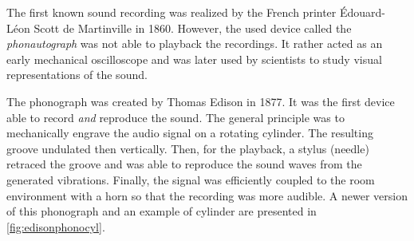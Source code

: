 The first known sound recording was realized by the French printer Édouard-Léon Scott de Martinville in 1860. However, the used device called the \emph{phonautograph} was not able to playback the recordings. It rather acted as an early mechanical oscilloscope and was later used by scientists to study visual representations of the sound.

The phonograph was created by Thomas Edison in 1877. It was the first device able to record \emph{and} reproduce the sound. The general principle was to mechanically engrave the audio signal on a rotating cylinder. The resulting groove undulated then vertically. Then, for the playback, a stylus (needle) retraced the groove and was able to reproduce the sound waves from the generated vibrations. Finally, the signal was efficiently coupled to the room environment with a horn so that the recording was more audible. A newer version of this phonograph and an example of cylinder are presented in \autoref{fig:edisonphonocyl}.

